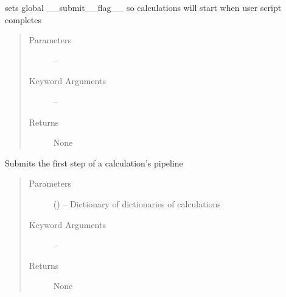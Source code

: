 \documentclass[letterpaper,10pt,english]{sphinxmanual}
\begin{document}
\begin{fulllineitems}
\label{\detokenize{run:run.submit}}
sets global \_\_submit\_\_flag\_\_ so calculations will start when user script completes
\begin{quote}\begin{description}
\item[{Parameters}] \leavevmode
{} -- 

\item[{Keyword Arguments}] \leavevmode
{} -- 

\item[{Returns}] \leavevmode
None

\end{description}\end{quote}

\end{fulllineitems}


\begin{fulllineitems}
\label{\detokenize{run:run.submitFirstCalcs__}}
Submits the first step of a calculation's pipeline
\begin{quote}\begin{description}
\item[{Parameters}] \leavevmode
{} () -- Dictionary of dictionaries of calculations

\item[{Keyword Arguments}] \leavevmode
{} -- 

\item[{Returns}] \leavevmode
None

\end{description}\end{quote}

\end{fulllineitems}

\end{document}
